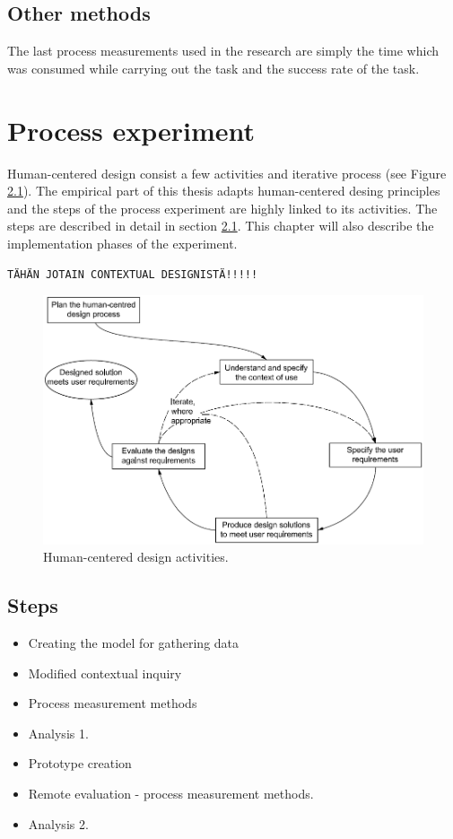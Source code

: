 \documentclass[12pt,a4paper,oneside,pdftex]{report}
\begin{document}
	

\section{Other methods}
\label{sec:other}
The last process measurements used in the research are simply the time which was consumed while carrying out the task and the success rate of the task.


 
    
\chapter{Process experiment}
\label{processexperiment}

Human-centered design consist a few activities and iterative process (see Figure \ref{fig:hci_process}). \cite{RefWorks:16} The empirical part of this thesis adapts human-centered desing principles and the steps of the process experiment are highly linked to its activities. The steps are described in detail in section \ref{sec:steps}. This chapter will also describe the implementation phases of the experiment. 

\texttt{TÄHÄN JOTAIN CONTEXTUAL DESIGNISTÄ!!!!!}

\begin{figure}[H]
  	\centering
    	\includegraphics[width=1.0\textwidth]{./images/hci_process.png}
  	\caption{Human-centered design activities.\cite{RefWorks:16}}
	\label{fig:hci_process}
\end{figure}

    \section{Steps}
    \label{sec:steps}
        \begin{itemize}
            \item Creating the model for gathering data
            \item Modified contextual inquiry 
            \item Process measurement methods
            \item Analysis 1.
            \item Prototype creation
            \item Remote evaluation - process measurement methods.
            \item Analysis 2.
        \end{itemize}
\end{document}
